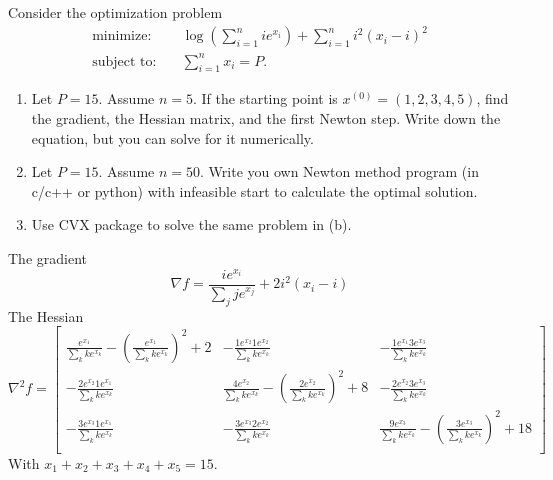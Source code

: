 \documentclass[11pt]{article}
\begin{document}
\begin{homeworkProblem}

    Consider the optimization problem
    \begin{align*}
        \text{minimize:} \quad   & \log\left(\sum_{i=1}^{n} ie^{x_i}\right) + \sum_{i=1}^{n} i^2(x_i - i)^2 \\
        \text{subject to:} \quad & \sum_{i=1}^{n} x_i = P.
    \end{align*}
    \begin{enumerate}[label=(\alph*), topsep=5pt, itemsep=5pt]
        \item Let $P = 15$. Assume $n = 5$. If the starting point is $x^{(0)} = (1, 2, 3, 4, 5)$, find the gradient,
              the Hessian matrix, and the first Newton step. Write down the equation, but you can
              solve for it numerically.
        \item Let $P = 15$. Assume $n = 50$. Write you own Newton method program (in c/c++ or
              python) with infeasible start to calculate the optimal solution.
        \item Use CVX package to solve the same problem in (b). \newline
    \end{enumerate}
    \solution

    The gradient
    \[
        \nabla f = \frac{ie^{x_i}}{\sum_{j} je^{x_j}}  + 2i^2(x_i - i)
    \]
    The Hessian
    \[
        \nabla^2 f = \begin{bmatrix}
            \frac{e^{x_1}}{\sum_{k} ke^{x_k}} - \left(\frac{e^{x_1}}{\sum_{k} ke^{x_k}}\right)^2 + 2 & -\frac{1e^{x_2}1e^{x_2}}{\sum_{k} ke^{x_k}}                                                & -\frac{1e^{x_1}3e^{x_3}}{\sum_{k} ke^{x_k}}                                                 \\
            -\frac{2e^{x_2}1e^{x_1}}{\sum_{k} ke^{x_k}}                                              & \frac{4e^{x_2}}{\sum_{k} ke^{x_k}} - \left(\frac{2e^{x_2}}{\sum_{k} ke^{x_k}}\right)^2 + 8 & -\frac{2e^{x_2}3e^{x_3}}{\sum_{k} ke^{x_k}}                                                 \\
            -\frac{3e^{x_3}1e^{x_1}}{\sum_{k} ke^{x_k}}                                              & -\frac{3e^{x_3}2e^{x_2}}{\sum_{k} ke^{x_k}}                                                & \frac{9e^{x_3}}{\sum_{k} ke^{x_k}} - \left(\frac{3e^{x_3}}{\sum_{k} ke^{x_k}}\right)^2 + 18 \\
        \end{bmatrix}
    \]
    With $x_1 + x_2 + x_3 + x_4 + x_5 = 15$.

\end{homeworkProblem}
\end{document}
